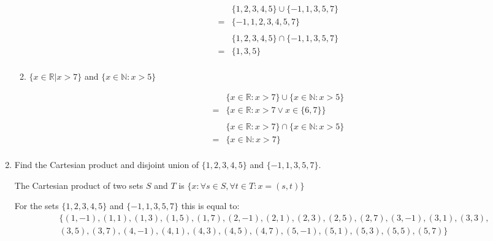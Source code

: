 \documentclass[10pt,\jkfside,a4paper]{article}
\begin{document}
\begin{enumerate}
\begin{enumerate}
\begin{equation}
\begin{split}
  &\{1, 2, 3, 4, 5\} \cup \{-1, 1, 3, 5, 7\}\\
= &\{-1, 1, 2, 3, 4, 5, 7\}\\
\end{split}
\end{equation}
\begin{equation}
\begin{split}
  &\{1, 2, 3, 4, 5\} \cap \{-1, 1, 3, 5, 7\}\\
= &\{1, 3, 5\}\\
\end{split}
\end{equation}

\item $\{x \in \mathbb{R}| x > 7\}$ and $\{ x \in \mathbb{N}: x > 5\}$

\begin{equation}
\begin{split}
 & \{x \in \mathbb{R}: x > 7\} \cup \{ x \in \mathbb{N}: x > 5\}\\
=& \{x \in \mathbb{R}: x > 7 \vee x \in \{6, 7\}\}\\
\end{split}
\end{equation}
\begin{equation}
\begin{split}
 & \{x \in \mathbb{R}: x > 7\} \cap \{ x \in \mathbb{N}: x > 5\}\\
=& \{x \in \mathbb{N}: x > 7\}\\
\end{split}
\end{equation}

\end{enumerate}

\item Find the Cartesian product and disjoint union of $\{1, 2, 3, 4, 5\}$ and $\{-1, 1, 3, 5, 7\}$.

The Cartesian product of two sets $S$ and $T$ is $\{x: \forall s \in S, \forall t \in T: x = (s, t)\}$

For the sets $\{1, 2, 3, 4, 5\}$ and $\{-1, 1, 3, 5, 7\}$ this is equal to:
\begin{equation}
\begin{split}
&\{(1, -1), (1, 1), (1, 3), (1, 5), (1, 7), (2, -1), (2, 1), (2, 3), (2, 5), (2, 7), (3, -1), (3, 1), (3, 3), \\&(3, 5), (3, 7), (4, -1), (4, 1), (4, 3), (4, 5), (4, 7), (5, -1), (5, 1), (5, 3), (5, 5), (5, 7)\}\\
\end{split}
\end{equation}


\end{enumerate}
\end{document}

